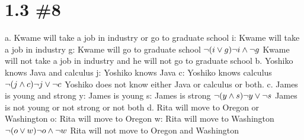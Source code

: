 \documentclass[h]{article}
\begin{document}
\section*{1.3 \#8}
a. Kwame will take a job in industry or go to graduate school\newline
i: Kwame will take a job in industry \newline
g: Kwame will go to graduate school\newline
$\neg(i \vee g) \newline
\neg i \wedge \neg g $ \newline
Kwame will not take a job in industry and he will not go to graduate school
\newline \newline
b. Yoshiko knows Java and calculus\newline
j: Yoshiko knows Java\newline 
c: Yoshiko knows calculus\newline
$\neg (j \wedge c) \newline
\neg j \vee \neg c \newline$
Yoshiko does not know either Java or calculus or both.
\newline \newline
c. James is young and strong\newline
y: James is young \newline
s: James is strong \newline
$ \neg (y \wedge s)\newline
\neg y \vee \neg s \newline$
James is not young or not strong or not both
\newline \newline
d. Rita will move to Oregon or Washington\newline
o: Rita will move to Oregon \newline
w: Rita will move to Washington\newline
$ \neg (o \vee w)\newline
\neg o \wedge \neg w \newline $
Rita will not move to Oregon and Washington
\end{document}
